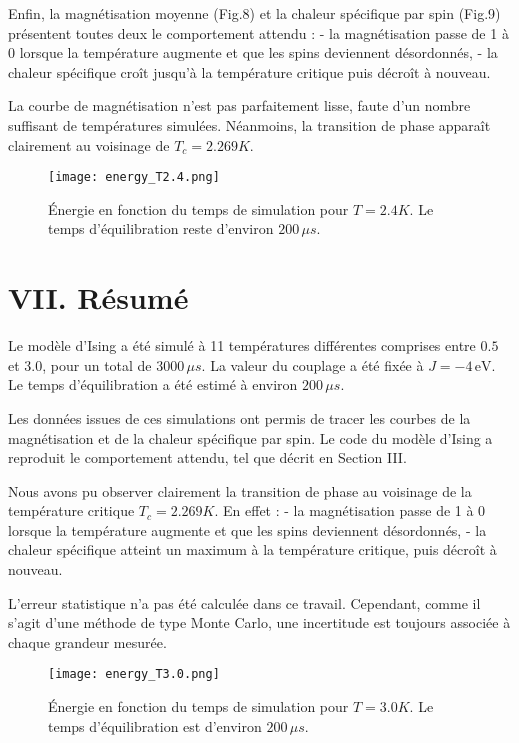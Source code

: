 \documentclass[a4paper,11pt]{article}
\begin{document}
Enfin, la magnétisation moyenne (Fig.8) et la chaleur spécifique par spin (Fig.9) présentent toutes deux le comportement attendu :  
- la magnétisation passe de 1 à 0 lorsque la température augmente et que les spins deviennent désordonnés,  
- la chaleur spécifique croît jusqu’à la température critique puis décroît à nouveau.  

La courbe de magnétisation n’est pas parfaitement lisse, faute d’un nombre suffisant de températures simulées. Néanmoins, la transition de phase apparaît clairement au voisinage de $T_c = 2.269K$.

\begin{figure}[H]
    \centering
    \texttt{[image: energy\_T2.4.png]}
    \caption{Énergie en fonction du temps de simulation pour $T = 2.4K$. Le temps d’équilibration reste d’environ $200 \, \mu s$.}
    \label{fig:energyT2.4}
\end{figure}



\section*{VII. Résumé}

Le modèle d’Ising a été simulé à 11 températures différentes comprises entre $0.5$ et $3.0$, pour un total de $3000 \, \mu s$. La valeur du couplage a été fixée à $J = -4 \, \text{eV}$.  
Le temps d’équilibration a été estimé à environ $200 \, \mu s$.  

Les données issues de ces simulations ont permis de tracer les courbes de la magnétisation et de la chaleur spécifique par spin. Le code du modèle d’Ising a reproduit le comportement attendu, tel que décrit en Section III.  

Nous avons pu observer clairement la transition de phase au voisinage de la température critique $T_c = 2.269K$. En effet :  
- la magnétisation passe de 1 à 0 lorsque la température augmente et que les spins deviennent désordonnés,  
- la chaleur spécifique atteint un maximum à la température critique, puis décroît à nouveau.  

L’erreur statistique n’a pas été calculée dans ce travail. Cependant, comme il s’agit d’une méthode de type Monte Carlo, une incertitude est toujours associée à chaque grandeur mesurée.  

\begin{figure}[H]
    \centering
    \texttt{[image: energy\_T3.0.png]}
    \caption{Énergie en fonction du temps de simulation pour $T = 3.0K$. Le temps d’équilibration est d’environ $200 \, \mu s$.}
    \label{fig:energyT3.0}
\end{figure}
\end{document}
